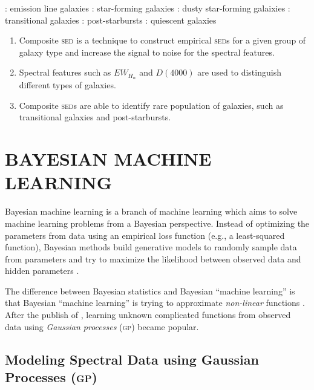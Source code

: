 \documentclass{ar-1col}
\begin{document}
\begin{marginnote}
     : emission line galaxies 
     : star-forming galaxies
     : dusty star-forming galaixies
     : transitional galaxies 
     : post-starbursts
     : quiescent galaxies
\end{marginnote}

\begin{summary}
    \begin{enumerate}
        \item Composite \textsc{sed} is a technique to construct empirical \textsc{sed}s for a given group of galaxy type and increase the signal to noise for the spectral features.
        \item Spectral features such as $EW_{H_\alpha}$ and $D(4000)$ are used to distinguish different types of galaxies.
        \item Composite \textsc{sed}s are able to identify rare population of galaxies, such as transitional galaxies and post-starbursts. 
    \end{enumerate}
\end{summary}    


\section{BAYESIAN MACHINE LEARNING}

Bayesian machine learning is a branch of machine learning which aims to solve machine learning problems from a Bayesian perspective. 
Instead of optimizing the parameters from data using an empirical loss function (e.g., a least-squared function), Bayesian methods build generative models to randomly sample data from parameters and try to maximize the likelihood between observed data and hidden parameters \citep{Barber2012}.

The difference between Bayesian statistics and Bayesian ``machine learning'' is that Bayesian ``machine learning'' is trying to approximate {\it non-linear} functions \citep{Bishop2003}. 
After the publish of \citet{Rasmussen2005}, learning unknown complicated functions from observed data using {\it Gaussian processes} (\textsc{gp}) became popular. 

\subsection{Modeling Spectral Data using Gaussian Processes (\textsc{gp})}
\end{document}
